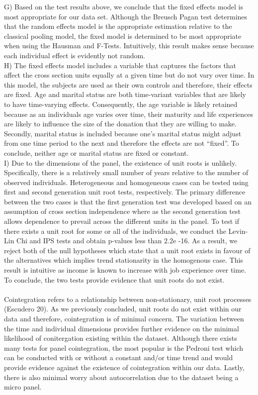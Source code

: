 \documentclass[12pt]{article}
\begin{document}
G) Based on the test results above, we conclude that the fixed effects model is most appropriate for our data set. Although the Breusch Pagan test determines that the random effects model is the appropriate estimation relative to the classical pooling model, the fixed model is determined to be most appropriate when using the Hausman and F-Tests. Intuitively, this result makes sense because each individual effect is evidently not random.\\

H) The fixed effects model includes a variable that captures the factors that affect the cross section units equally at a given time but do not vary over time. In this model, the subjects are used as their own controls and therefore, their effects are fixed.  Age and marital status are both time-variant variables that are likely to have time-varying effects. Consequently, the age variable is likely retained because as an individuals age varies over time, their maturity and life experiences are likely to influence the size of the donation that they are willing to make. Secondly, marital status is included because one’s marital status might adjust from one time period to the next and therefore the effects are not “fixed”. To conclude, neither age or marital status are fixed or constant. \\

I)  Due to the dimensions of the panel, the existence of unit roots is unlikely. Specifically, there is a relatively small number of years relative to the number of observed individuals. Heterogeneous and homogeneous cases can be tested using first and second generation unit root tests, respectively. The primary difference between the two cases is that the first generation test was developed based on an assumption of cross section independence where as the second generation test allows dependence to prevail across the different units in the panel. To test if there exists a unit root for some or all of the individuals, we conduct the Levin- Lin Chi and IPS tests and obtain p-values less than \num{2.2e -16}. As a result, we reject both of the null hypotheses which state that a unit root exists in favour of the alternatives which implies trend stationarity in the homogenous case. This result is intuitive as income is known to increase with job experience over time. To conclude, the two tests provide evidence that unit roots do not exist. \\\\
Cointegration refers to a relationship between non-stationary, unit root processes (Escudero 20). As we previously concluded, unit roots do not exist within our data and therefore, cointegration is of minimal concern. The variation between the time and individual dimensions provides further evidence on the minimal likelihood of conitergation existing within the dataset. Although there exists many tests for panel cointegration, the most popular is the Pedroni test which can be conducted with or without a constant and/or time trend and would provide evidence against the existence of cointegration within our data. Lastly, there is also minimal worry about autocorrelation due to the dataset being a micro panel. \\\\
\end{document}
